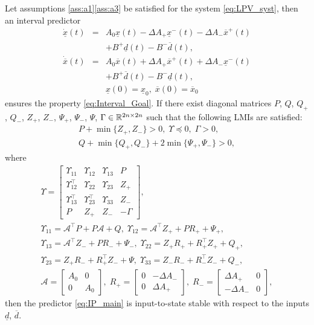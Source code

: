 \begin{theorem}
	\label{thm:main} Let assumptions \ref{ass:a1}\textendash \ref{ass:a3} be satisfied for the system \eqref{eq:LPV_syst}, then an interval predictor
	\begin{eqnarray}
	\dot{\underline{x}}(t) & = & A_{0}\underline{x}(t)-\Delta A_{+}\underline{x}^{-}(t)-\Delta A_{-}\overline{x}^{+}(t)\nonumber \\
	&  & +B^{+}\underline{d}(t)-B^{-}\overline{d}(t),\label{eq:IP_main}\\
	\dot{\overline{x}}(t) & = & A_{0}\overline{x}(t)+\Delta A_{+}\overline{x}^{+}(t)+\Delta A_{-}\underline{x}^{-}(t)\nonumber \\
	&  & +B^{+}\overline{d}(t)-B^{-}\underline{d}(t),\nonumber \\
	&  & \underline{x}(0)=\underline{x}_{0},\;\overline{x}(0)=\overline{x}_{0}\nonumber 
	\end{eqnarray}
	ensures the property \eqref{eq:Interval_Goal}. If there exist diagonal matrices $P$, $Q$, $Q_{+}$, $Q_{-}$, $Z_{+}$, $Z_{-}$, $\Psi_{+}$, $\Psi_{-}$, $\Psi$, $\Gamma\in\mathbb{R}^{2n\times2n}$ such that the following LMIs are satisfied:
	\begin{gather*}
	P+\min\{Z_{+},Z_{-}\}>0,\;\Upsilon\preceq0,\;\Gamma>0,\\
	Q+\min\{Q_{+},Q_{-}\}+2\min\{\Psi_{+},\Psi_{-}\}>0,
	\end{gather*}
	where{\footnotesize{}
		\begin{gather*}
		\Upsilon=\left[\begin{array}{cccc}
		\Upsilon_{11} & \Upsilon_{12} & \Upsilon_{13} & P\\
		\Upsilon_{12}^{\top} & \Upsilon_{22} & \Upsilon_{23} & Z_{+}\\
		\Upsilon_{13}^{\top} & \Upsilon_{23}^{\top} & \Upsilon_{33} & Z_{-}\\
		P & Z_{+} & Z_{-} & -\Gamma
		\end{array}\right],\\
		\Upsilon_{11}=\mathcal{A}^{\top}P+P\mathcal{A}+Q,\;\Upsilon_{12}=\mathcal{A}^{\top}Z_{+}+PR_{+}+\Psi_{+},\\
		\Upsilon_{13}=\mathcal{A}^{\top}Z_{-}+PR_{-}+\Psi_{-},\;\Upsilon_{22}=Z_{+}R_{+}+R_{+}^{\top}Z_{+}+Q_{+},\\
		\Upsilon_{23}=Z_{+}R_{-}+R_{+}^{\top}Z_{-}+\Psi,\;\Upsilon_{33}=Z_{-}R_{-}+R_{-}^{\top}Z_{-}+Q_{-},\\
		\mathcal{A}=\left[\begin{array}{cc}
		A_{0} & 0\\
		0 & A_{0}
		\end{array}\right],\;R_{+}=\left[\begin{array}{cc}
		0 & -\Delta A_{-}\\
		0 & \Delta A_{+}
		\end{array}\right],\;R_{-}=\left[\begin{array}{cc}
		\Delta A_{+} & 0\\
		-\Delta A_{-} & 0
		\end{array}\right],
		\end{gather*}
	}then the predictor \eqref{eq:IP_main} is input-to-state stable with respect to the inputs $\underline{d}$, $\overline{d}$.
\end{theorem}
